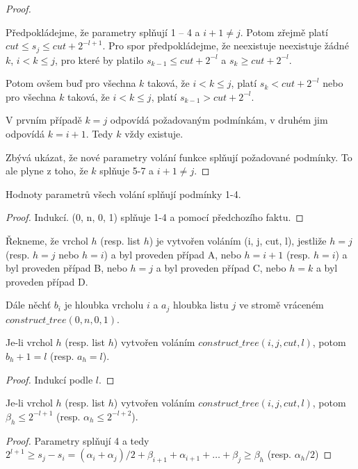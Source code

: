 \begin{proof} 
\ \par
Předpokládejme, že parametry splňují 1 -- 4 a $i + 1 \neq j$. 
Potom zřejmě platí $cut \leq s_j \leq cut + 2^{-l+1}$. Pro spor předpokládejme, 
že neexistuje neexistuje žádné $k$, $i < k \leq j$, pro které 
by platilo $s_{k-1} \leq cut+2^{-l}$ a $s_{k} \geq cut+2^{-l}$. 

Potom ovšem buď pro všechna $k$ taková, že $i < k \leq j$, 
platí $s_{k} < cut+2^{-l}$ nebo 
pro všechna $k$ taková, že $i < k \leq j$, platí $s_{k-1} > cut+2^{-l}$.

\par
V prvním případě $k = j$ odpovídá požadovaným podmínkám, 
v druhém jim odpovídá $k = i + 1$. Tedy $k$ vždy existuje.

\par
Zbývá ukázat, že nové parametry volání funkce splňují požadované 
pod\-mín\-ky. To ale plyne z toho, že $k$ splňuje 5-7 a  $i+1 \neq j$.
\end{proof}

\begin{fakt}
Hodnoty parametrů všech volání  splňují podmínky 1-4.
\end{fakt}
\begin{proof} 
Indukcí. (0, n, 0, 1) splňuje 1-4 a pomocí předchozího faktu.
\end{proof}

Řekneme, že vrchol $h$ (resp. list $h$) je vytvořen voláním 
(i, j, cut, l), jestliže $h = j$ (resp. $h =j$ nebo $h = i$) a 
byl proveden případ A, nebo $h = i + 1$ (resp. $h = i$) a byl proveden případ B, 
nebo $h = j$ a byl proveden případ C, nebo  $h = k$ 
a byl proveden případ D.

\par
Dále něchť $b_i$ je hloubka vrcholu $i$ a $a_j$ hloubka listu $j$ ve 
stromě vráceném $construct\_tree(0,n,0,1)$.

\begin{fakt}
Je-li vrchol $h$ (resp. list $h$) vytvořen voláním 
$construct\_tree(i,j,cut,l)$, potom $b_h + 1 = l$ (resp. $a_h = l$).
\end{fakt}
\begin{proof}
Indukcí podle $l$. 
\end{proof}
\begin{fakt}
Je-li vrchol $h$ (resp. list $h$) vytvořen voláním 
$construct\_tree(i,j,cut,l)$, potom $\beta_h \leq 2^{-l+1}$ (resp. $\alpha_h \leq 2^{-l+2}$).
\end{fakt}
\begin{proof}
Parametry splňují 4 a tedy
$2^{l+1} \geq s_j - s_i = (\alpha_i + \alpha_j)/2 + \beta_{i+1} + \alpha_{i+1} + \ldots + \beta_j \geq \beta_h$ (resp. $\alpha_h/2$)
\end{proof}

